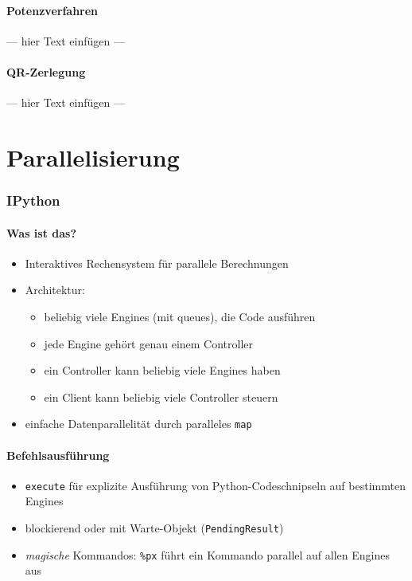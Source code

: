 \documentclass[a4paper, 12pt]{article}
\begin{document}
\subsection{Potenzverfahren}
--- hier Text einfügen ---


\subsection{QR-Zerlegung}
--- hier Text einfügen ---




\part{Parallelisierung}



\section{IPython}


\subsection{Was ist das?}
\begin{itemize}
  \item Interaktives Rechensystem für parallele Berechnungen
  \item Architektur:
    \begin{itemize}
      \item beliebig viele Engines (mit queues), die Code ausführen
      \item jede Engine gehört genau einem Controller
      \item ein Controller kann beliebig viele Engines haben
      \item ein Client kann beliebig viele Controller steuern
    \end{itemize}
  \item einfache Datenparallelität durch paralleles \texttt{map}
\end{itemize}


\subsection{Befehlsausführung}
\begin{itemize}
  \item \texttt{execute} für explizite Ausführung von Python-Codeschnipseln auf bestimmten Engines
  \item blockierend oder mit Warte-Objekt (\texttt{PendingResult})
  \item \emph{magische} Kommandos: \texttt{\%px} führt ein Kommando parallel auf allen Engines aus
\end{itemize}
\end{document}
